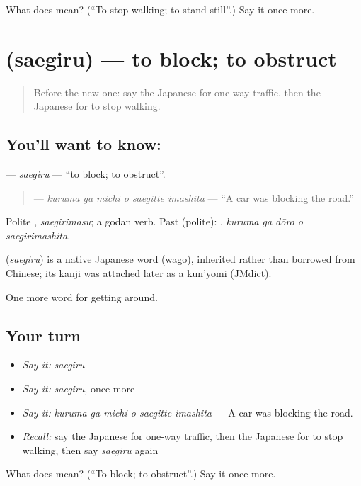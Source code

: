 \begin{tcolorbox}[breakable,colback=teal!4,colframe=teal!35!black,title={Before you move on}]
What does  mean? (\textquotedblleft{}To stop walking; to stand still\textquotedblright{}.) Say it once more.
\end{tcolorbox}
\section[\texorpdfstring{\ja{さえぎる} (saegiru)}{さえぎる (saegiru)}]{ (saegiru) — to block; to obstruct}

\label{lesson:JA-C391-saegiru}



\begin{quote}
Before the new one: say the Japanese for one-way traffic, then the Japanese for to stop walking.
\end{quote}

\subsection*{You'll want to know: }
\textbf{} — \emph{saegiru} — \textquotedblleft{}to block; to obstruct\textquotedblright{}.

\begin{quote}
\textbf{  } — \emph{kuruma ga michi o saegitte imashita} — \textquotedblleft{}A car was blocking the road.\textquotedblright{}
\end{quote}

Polite \textbf{}, \emph{saegirimasu}; a godan verb. Past (polite): \textbf{  }, \emph{kuruma ga dōro o saegirimashita}.

\begin{cousinweb}
\textbf{} (\emph{saegiru}) is a native Japanese word (wago), inherited rather than borrowed from Chinese; its kanji was attached later as a kun'yomi (JMdict).
\end{cousinweb}

\begin{grammarlens}[title={What you've built}]
One more word for getting around.
\end{grammarlens}

\subsection*{Your turn}
\begin{itemize}
\raggedright
  \item \emph{Say it:} \emph{saegiru}
  \item \emph{Say it:} \emph{saegiru}, once more
  \item \emph{Say it:} \emph{kuruma ga michi o saegitte imashita} — A car was blocking the road.
  \item \emph{Recall:} say the Japanese for one-way traffic, then the Japanese for to stop walking, then say \emph{saegiru} again
\end{itemize}

\begin{tcolorbox}[breakable,colback=teal!4,colframe=teal!35!black,title={Before you move on}]
What does  mean? (\textquotedblleft{}To block; to obstruct\textquotedblright{}.) Say it once more.
\end{tcolorbox}

